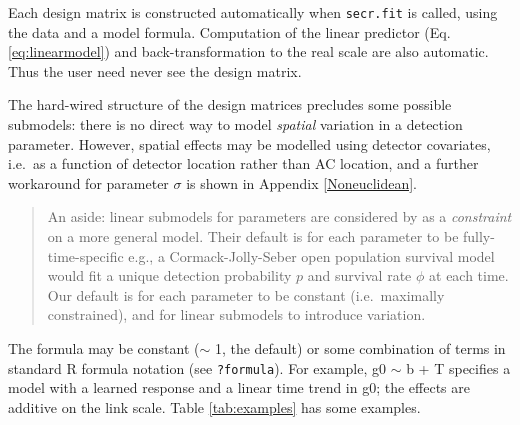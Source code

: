 \documentclass[
]{book}
\begin{document}
Each design matrix is constructed automatically when \texttt{secr.fit} is called, using the data and a model formula. Computation of the linear predictor (Eq. \eqref{eq:linearmodel}) and back-transformation to the real scale are also automatic. Thus the user need never see the design matrix.

The hard-wired structure of the design matrices precludes some possible submodels: there is no direct way to model \emph{spatial} variation in a detection parameter. However, spatial effects may be modelled using detector covariates, i.e.~as a function of detector location rather than AC location, and a further workaround for parameter \(\sigma\) is shown in Appendix \ref{Noneuclidean}.

\begin{quote}
An aside: linear submodels for parameters are considered by \citet{cw} as a \emph{constraint} on a more general model. Their default is for each parameter to be fully-time-specific e.g., a Cormack-Jolly-Seber open population survival model would fit a unique detection probability \(p\) and survival rate \(\phi\) at each time. Our default is for each parameter to be constant (i.e.~maximally constrained), and for linear submodels to introduce variation.
\end{quote}

The formula may be constant (\(\sim\) 1, the default) or some combination of terms in standard R
formula notation (see \texttt{?formula}). For example, g0 \(\sim\) b + T
specifies a model with a learned response and a linear time trend in
g0; the effects are additive on the link scale. Table \ref{tab:examples} has some examples.
\end{document}
